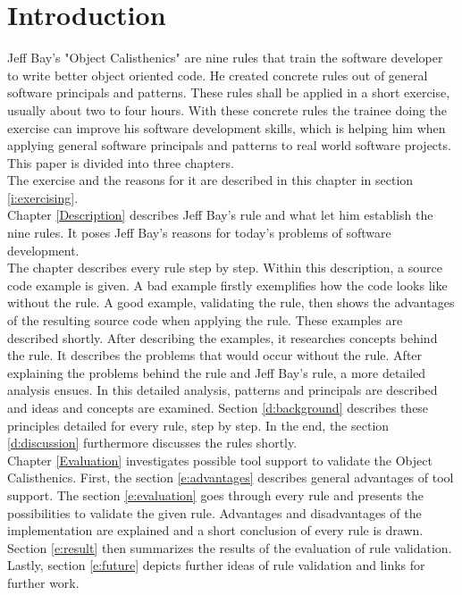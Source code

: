 
\chapter{Introduction}
Jeff Bay's "Object Calisthenics" \cite{bay2008} are nine rules that train the software developer to write better object oriented code.  He created concrete rules out of general software principals and patterns. These rules shall be applied in a short exercise, usually about two to four hours. With these concrete rules the trainee doing the exercise can improve his software development skills, which is helping him when applying general software principals and patterns to real world software projects. 
This paper is divided into three chapters.\\
The exercise and the reasons for it are described in this chapter in section \ref{i:exercising}.\\


Chapter \ref{Description} describes Jeff Bay's rule and what let him establish the nine rules. It poses Jeff Bay's reasons for today's problems of software development.\\

The chapter describes every rule step by step. Within this description, a source code example is given. A bad example firstly exemplifies how the code looks like without the rule. A good example, validating the rule, then shows the advantages of the resulting source code when applying the rule. These examples are described shortly. After describing the examples, it researches concepts behind the rule. It describes the problems that would occur without the rule. After explaining the problems behind the rule and Jeff Bay's rule, a more detailed analysis ensues. In this detailed analysis, patterns and principals are described and ideas and concepts are examined. Section \ref{d:background} describes these principles detailed for every rule, step by step. In the end, the section \ref{d:discussion} furthermore discusses the rules shortly.\\

Chapter \ref{Evaluation} investigates possible tool support to validate the Object Calisthenics. First, the section \ref{e:advantages} describes general advantages of tool support. The section \ref{e:evaluation} goes through every rule and presents the possibilities to validate the given rule. Advantages and disadvantages of the implementation are explained and a short conclusion of every rule is drawn. Section \ref{e:result} then summarizes the results of the evaluation of rule validation. Lastly, section \ref{e:future} depicts further ideas of rule validation and links for further work.\\

